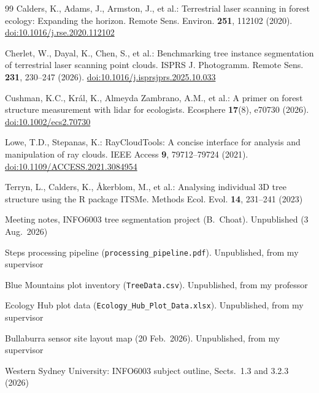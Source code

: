 \documentclass[runningheads]{llncs}
\begin{document}
\begin{thebibliography}{99}\setlength{\itemsep}{0pt}
Calders, K., Adams, J., Armston, J., et al.: Terrestrial laser scanning in forest ecology: Expanding the horizon. Remote Sens. Environ. \textbf{251}, 112102 (2020). \href{https://doi.org/10.1016/j.rse.2020.112102}{doi:10.1016/j.rse.2020.112102}

Cherlet, W., Dayal, K., Chen, S., et al.: Benchmarking tree instance segmentation of terrestrial laser scanning point clouds. ISPRS J. Photogramm. Remote Sens. \textbf{231}, 230--247 (2026). \href{https://doi.org/10.1016/j.isprsjprs.2025.10.033}{doi:10.1016/j.isprsjprs.2025.10.033}

Cushman, K.C., Kr\'al, K., Almeyda Zambrano, A.M., et al.: A primer on forest structure measurement with lidar for ecologists. Ecosphere \textbf{17}(8), e70730 (2026). \href{https://doi.org/10.1002/ecs2.70730}{doi:10.1002/ecs2.70730}

Lowe, T.D., Stepanas, K.: RayCloudTools: A concise interface for analysis and manipulation of ray clouds. IEEE Access \textbf{9}, 79712--79724 (2021). \href{https://doi.org/10.1109/ACCESS.2021.3084954}{doi:10.1109/ACCESS.2021.3084954}

Terryn, L., Calders, K., \AA{}kerblom, M., et al.: Analysing individual 3D tree structure using the R package ITSMe. Methods Ecol. Evol. \textbf{14}, 231--241 (2023)

Meeting notes, INFO6003 tree segmentation project (B.~Choat). Unpublished (3 Aug.\ 2026)

Steps processing pipeline (\nolinkurl{processing_pipeline.pdf}). Unpublished, from my supervisor

Blue Mountains plot inventory (\nolinkurl{TreeData.csv}). Unpublished, from my professor

Ecology Hub plot data (\nolinkurl{Ecology_Hub_Plot_Data.xlsx}). Unpublished, from my supervisor

Bullaburra sensor site layout map (20 Feb.\ 2026). Unpublished, from my supervisor

Western Sydney University: INFO6003 subject outline, Sects.~1.3 and 3.2.3 (2026)
\end{thebibliography}
\end{document}
